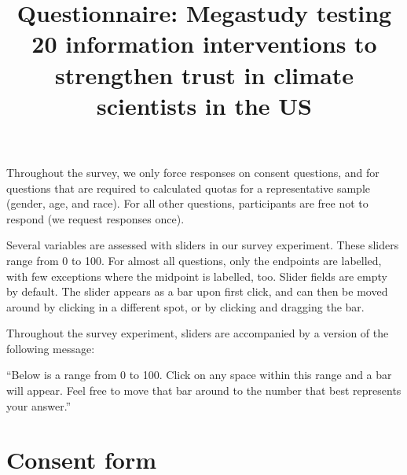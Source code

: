 \documentclass[
  letterpaper,
  DIV=11,
  numbers=noendperiod]{scrartcl}
\title{Questionnaire: Megastudy testing 20 information interventions to
strengthen trust in climate scientists in the US}
\author{}
\date{}
\renewcommand*\contentsname{Table of contents}
\newcommand\contentsname{Table of contents}
\begin{document}
\maketitle

\renewcommand*\contentsname{Table of contents}
{
\hypersetup{linkcolor=}
\setcounter{tocdepth}{4}
\tableofcontents
}

\clearpage

\begin{tcolorbox}[enhanced jigsaw, toprule=.15mm, toptitle=1mm, colframe=quarto-callout-note-color-frame, leftrule=.75mm, rightrule=.15mm, bottomtitle=1mm, coltitle=black, colbacktitle=quarto-callout-note-color!10!white, bottomrule=.15mm, breakable, opacityback=0, titlerule=0mm, title=\textcolor{quarto-callout-note-color}{\faInfo}\hspace{0.5em}{A note on response options and requirements}, left=2mm, arc=.35mm, opacitybacktitle=0.6, colback=white]

Throughout the survey, we only force responses on consent questions, and
for questions that are required to calculated quotas for a
representative sample (gender, age, and race). For all other questions,
participants are free not to respond (we request responses once).

Several variables are assessed with sliders in our survey experiment.
These sliders range from 0 to 100. For almost all questions, only the
endpoints are labelled, with few exceptions where the midpoint is
labelled, too. Slider fields are empty by default. The slider appears as
a bar upon first click, and can then be moved around by clicking in a
different spot, or by clicking and dragging the bar.

Throughout the survey experiment, sliders are accompanied by a version
of the following message\footnotemark{}:

``Below is a range from 0 to 100. Click on any space within this range
and a bar will appear. Feel free to move that bar around to the number
that best represents your answer.''

\end{tcolorbox}


\section{Consent form}\label{consent-form}
\end{document}
